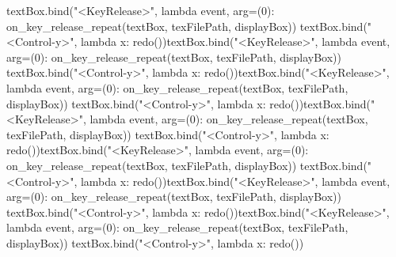 textBox.bind("<KeyRelease>", lambda event, arg=(0): on_key_release_repeat(textBox, texFilePath, displayBox))
textBox.bind("<Control-y>", lambda x: redo())textBox.bind("<KeyRelease>", lambda event, arg=(0): on_key_release_repeat(textBox, texFilePath, displayBox))
textBox.bind("<Control-y>", lambda x: redo())textBox.bind("<KeyRelease>", lambda event, arg=(0): on_key_release_repeat(textBox, texFilePath, displayBox))
textBox.bind("<Control-y>", lambda x: redo())textBox.bind("<KeyRelease>", lambda event, arg=(0): on_key_release_repeat(textBox, texFilePath, displayBox))
textBox.bind("<Control-y>", lambda x: redo())textBox.bind("<KeyRelease>", lambda event, arg=(0): on_key_release_repeat(textBox, texFilePath, displayBox))
textBox.bind("<Control-y>", lambda x: redo())textBox.bind("<KeyRelease>", lambda event, arg=(0): on_key_release_repeat(textBox, texFilePath, displayBox))
textBox.bind("<Control-y>", lambda x: redo())textBox.bind("<KeyRelease>", lambda event, arg=(0): on_key_release_repeat(textBox, texFilePath, displayBox))
textBox.bind("<Control-y>", lambda x: redo())
